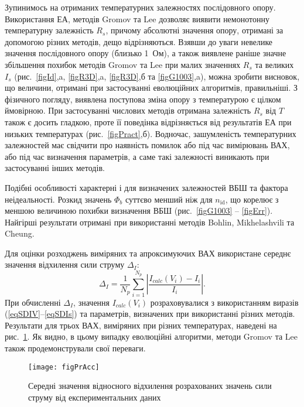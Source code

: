 Зупинимось на отриманих температурних залежностях послідовного опору.
Використання ЕА, методів Gromov та Lee дозволяє виявити немонотонну температурну залежність $R_s$, причому абсолютні значення опору, отримані за допомогою різних методів, дещо відрізняються.
Взявши до уваги невелике значення послідовного опору (близько 1~Ом), а також виявлене раніше значне збільшення похибок методів Gromov та Lee при малих значеннях $R_s$ та великих $I_s$ (рис.~\ref{figId},a, \ref{figR3D},a, \ref{figR3D},б та \ref{figG1003},a), можна зробити висновок, що величини, отримані при застосуванні еволюційних алгоритмів, правильніші.
З фізичного погляду, виявлена поступова зміна опору з температурою є цілком ймовірною.
При застосуванні числових методів отримана залежність $R_s$ від $T$ також є досить гладкою, проте її поведінка відрізняється від результатів ЕА при низьких температурах (рис.~\ref{figPract},б).
Водночас, зашумленість температурних залежностей має свідчити про наявність помилок або під час вимірювань ВАХ, або під час визначення параметрів, а саме такі залежності виникають при застосуванні інших методів.

Подібні особливості характерні і для визначених залежностей ВБШ та фактора неідеальності.
Розкид значень $\Phi_b$ суттєво менший ніж для $n_\mathrm{id}$, що корелює з меншою величиною похибки визначення ВБШ (рис.~\ref{figG1003} -- \ref{figErr}).
Найгірші результати отримані при використанні методів Bohlin, Mikhelashvili та Cheung.

Для оцінки розходжень виміряних та апроксимуючих ВАХ використане середнє значення відхилення сили струму $\Delta_I$:
 \begin{equation}
 \label{eqMCur}
 \Delta_I=\frac{1}{N_p}\sum_{i=1}^{N_p}\left|\frac{I_{calc}(V_i)-I_i}{I_i}\right|.
 \end{equation}
При обчисленні $\Delta_I$, значення $I_{calc}(V_i)$ розраховувалися з використанням виразів (\ref{eqSDIV}--\ref{eqSDIs}) та параметрів, визначених при використанні різних методів.
Результати для трьох ВАХ, виміряних при різних температурах, наведені на рис.~\ref{figPrAcc}.
Як видно, в цьому випадку еволюційні алгоритми, методи Gromov та Lee також продемонстрували свої переваги.


\begin{figure}
\center
\texttt{[image: figPrAcc]}%
\caption{\label{figPrAcc}
Середні значення відносного відхилення розрахованих значень сили струму від експериментальних даних
}
\end{figure}

